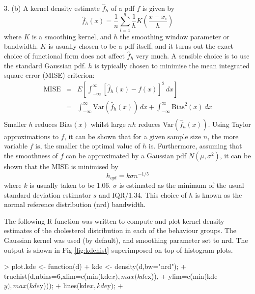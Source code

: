 \documentclass[a4paper,11pt]{article}
\begin{document}
3. (b) A kernel density estimate $\hat{f}_h$ of a pdf $f$ is given by
\begin{equation*}
 \hat{f}_h(x) = \frac{1}{n}\sum_{i=1}^n\frac{1}{h}K\left(\frac{x-x_i}{h}\right)
  \end{equation*}
where $K$ is a smoothing kernel, and $h$ the smoothing window
parameter or bandwidth. $K$ is usually chosen to be a pdf itself, and
it turns out the exact choice of functional form does not affect
$\hat{f}_h$ very much. A sensible choice is to use the standard
Gaussian pdf. $h$ is typically chosen to minimise the mean integrated
square error (MISE) criterion:
\begin{eqnarray*}
  \mbox{MISE} & = &
   E\left[\int_{-\infty}^{\infty}\! [\hat{f}_h(x)-f(x)]^2 \, dx \right]\\
              & = &
   \int_{-\infty}^{\infty}\! \mbox{Var}\left(\hat{f}_h(x)\right)\, dx +
   \int_{-\infty}^{\infty}\! \mbox{Bias}^2(x)\, dx\\
\end{eqnarray*}
Smaller $h$ reduces Bias$(x)$ whilst large $nh$ reduces
Var$(\hat{f}_h(x))$. Using Taylor approximations to $f$, it can be
shown that for a given sample size $n$, the more variable $f$ is, the
smaller the optimal value of $h$ is. Furthermore, assuming that the
smoothness of $f$ can be approximated by a Gaussian pdf
$N(\mu,\sigma^2)$, it can be shown that the MISE is minimised by
\begin{equation*}
  h_{opt} = k\sigma n^{-1/5}
\end{equation*}
where $k$ is usually taken to be 1.06. $\sigma$ is estimated as the
minimum of the usual standard deviation estimator $s$ and
IQR/1.34. This choice of $h$ is known as the normal reference
distribution (nrd) bandwidth.

The following R function was written to compute and plot kernel density
estimates of the cholesterol distribution in each of the behaviour
groups. The Gaussian kernel was used (by default), and smoothing
parameter set to nrd. The output is shown in Fig \ref{fig:kdehist}
superimposed on top of histogram plots.

\begin{Schunk}
\begin{Sinput}
> plot.kde <- function(d) {
+     kde <- density(d,bw="nrd");
+     truehist(d,nbins=6,xlim=c(min(kde$x),max(kde$x)),
+                        ylim=c(min(kde$y),max(kde$y)));
+     lines(kde$x,kde$y);
+ }
\end{Sinput}
\end{Schunk}
\end{document}
